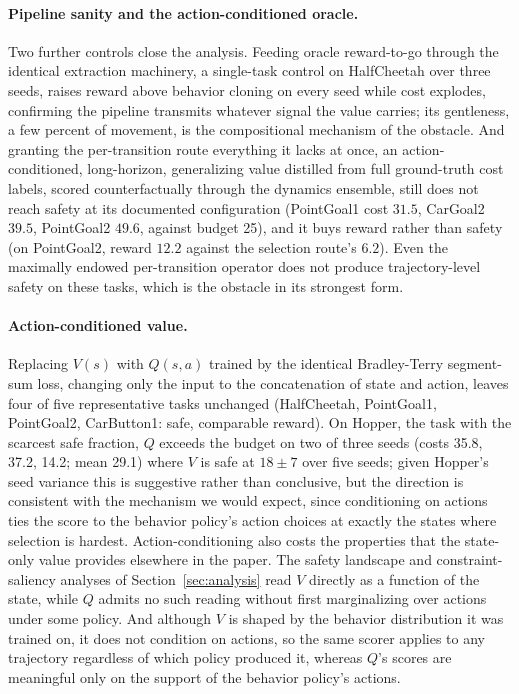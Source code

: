 \documentclass{article} %
\begin{document}
\paragraph{Pipeline sanity and the action-conditioned oracle.} Two further controls close the analysis. Feeding oracle reward-to-go through the identical extraction machinery, a single-task control on HalfCheetah over three seeds, raises reward above behavior cloning on every seed while cost explodes, confirming the pipeline transmits whatever signal the value carries; its gentleness, a few percent of movement, is the compositional mechanism of the obstacle. And granting the per-transition route everything it lacks at once, an action-conditioned, long-horizon, generalizing value distilled from full ground-truth cost labels, scored counterfactually through the dynamics ensemble, still does not reach safety at its documented configuration (PointGoal1 cost $31.5$, CarGoal2 $39.5$, PointGoal2 $49.6$, against budget 25), and it buys reward rather than safety (on PointGoal2, reward $12.2$ against the selection route's $6.2$). Even the maximally endowed per-transition operator does not produce trajectory-level safety on these tasks, which is the obstacle in its strongest form.

\paragraph{Action-conditioned value.} Replacing $V(s)$ with $Q(s, a)$ trained by the identical Bradley-Terry segment-sum loss, changing only the input to the concatenation of state and action, leaves four of five representative tasks unchanged (HalfCheetah, PointGoal1, PointGoal2, CarButton1: safe, comparable reward). On Hopper, the task with the scarcest safe fraction, $Q$ exceeds the budget on two of three seeds (costs 35.8, 37.2, 14.2; mean 29.1) where $V$ is safe at $18 \pm 7$ over five seeds; given Hopper's seed variance this is suggestive rather than conclusive, but the direction is consistent with the mechanism we would expect, since conditioning on actions ties the score to the behavior policy's action choices at exactly the states where selection is hardest. Action-conditioning also costs the properties that the state-only value provides elsewhere in the paper. The safety landscape and constraint-saliency analyses of Section~\ref{sec:analysis} read $V$ directly as a function of the state, while $Q$ admits no such reading without first marginalizing over actions under some policy. And although $V$ is shaped by the behavior distribution it was trained on, it does not condition on actions, so the same scorer applies to any trajectory regardless of which policy produced it, whereas $Q$'s scores are meaningful only on the support of the behavior policy's actions.
\end{document}
